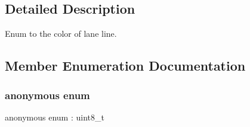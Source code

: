 \subsection{Detailed Description}
Enum to the color of lane line. 

\subsection{Member Enumeration Documentation}
\mbox{\label{structmaf__perception__interface_1_1LaneColorEnum_af7b00f1dcb9961279936fc5908584851}} 
\subsubsection{\texorpdfstring{anonymous enum}{anonymous enum}}
{\footnotesize\ttfamily anonymous enum \+: uint8\+\_\+t}

